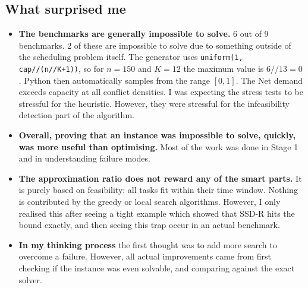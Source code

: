 \subsection{What surprised me}
\begin{itemize}
\item \textbf{The benchmarks are generally impossible to solve.} 6 out of
  9 benchmarks. 2 of these are impossible to solve due to something outside
  of the scheduling problem itself. The generator uses
  \texttt{uniform(1, cap//(n//K+1))}, so for $n{=}150$ and $K{=}12$ the
  maximum value is $6//13=0$. Python then automatically samples from the
  range $[0,1]$. The Net demand exceeds capacity at all conflict densities.
  I was expecting the stress tests to be stressful for the heuristic.
  However, they were stressful for the infeasibility detection part of the
  algorithm.
\item \textbf{Overall, proving that an instance was impossible to solve,
  quickly, was more useful than optimising.} Most of the work was done in
  Stage 1 and in understanding failure modes.
\item \textbf{The approximation ratio does not reward any of the smart
  parts.} It is purely based on feasibility: all tasks fit within their
  time window. Nothing is contributed by the greedy or local search
  algorithms. However, I only realised this after seeing a tight example
  which showed that SSD-R hits the bound exactly, and then seeing this trap
  occur in an actual benchmark.
\item \textbf{In my thinking process} the first thought was to add more
  search to overcome a failure. However, all actual improvements came from
  first checking if the instance was even solvable, and comparing against
  the exact solver.
\end{itemize}
